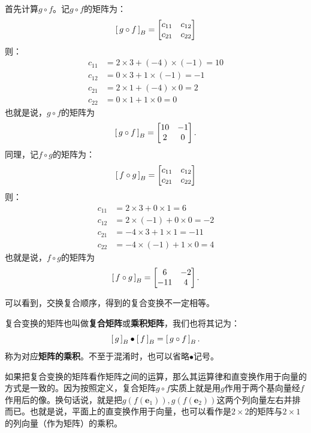 \documentclass[12pt,UTF8]{ctexbook}
\begin{document}
\begin{so}
    首先计算$g\circ f$。记$g\circ f$的矩阵为：    
    $$
        \bmat{g\circ f}[B] = 
        \begin{bmatrix}
            c_{11} & c_{12} \\ c_{21} & c_{22}
        \end{bmatrix}
    $$
    则：
    \begin{align*}
        c_{11} &= 2 \times 3 + (-4)\times (-1) = 10 \\
        c_{12} &= 0 \times 3 + 1 \times (-1) = -1  \\
        c_{21} &= 2 \times 1 + (-4)\times 0 = 2  \\
        c_{22} &= 0 \times 1 + 1 \times 0 = 0  
    \end{align*}
    也就是说，$g\circ f$的矩阵为
    $$
        \bmat{g\circ f}[B] = 
        \begin{bmatrix}
            10 & -1 \\ 2 & 0
        \end{bmatrix}.
    $$
    同理，记$f\circ g$的矩阵为：    
    $$
        \bmat{f\circ g}[B] = 
        \begin{bmatrix}
            c_{11} & c_{12} \\ c_{21} & c_{22}
        \end{bmatrix}
    $$
    则：
    \begin{align*}
        c_{11} &= 2 \times 3 + 0 \times 1 = 6 \\
        c_{12} &= 2 \times (-1) + 0 \times 0 = -2  \\
        c_{21} &= -4 \times 3 + 1 \times 1 = -11  \\
        c_{22} &= -4 \times (-1) + 1 \times 0 = 4  
    \end{align*}
    也就是说，$f\circ g$的矩阵为
    $$
        \bmat{f\circ g}[B] = 
        \begin{bmatrix}
            6 & -2 \\ -11 & 4
        \end{bmatrix}.
    $$
\end{so}

可以看到，交换复合顺序，得到的复合变换不一定相等。

复合变换的矩阵也叫做\textbf{复合矩阵}或\textbf{乘积矩阵}，我们也将其记为：
$$ \bmat{g}[B] \bullet \bmat{f}[B] = \bmat{g\circ f}[B].$$
称为对应\textbf{矩阵的乘积}。不至于混淆时，也可以省略$\bullet$记号。

如果把复合变换的矩阵看作矩阵之间的运算，那么其运算律和直变换作用于向量的方式是一致的。因为按照定义，复合矩阵$g\circ f$实质上就是用$g$作用于两个基向量经$f$作用后的像。换句话说，就是把$g(f(\mathbf{e}_1)),g(f(\mathbf{e}_2))$这两个列向量左右并排而已。也就是说，平面上的直变换作用于向量，也可以看作是$2\times 2$的矩阵与$2\times 1$的列向量（作为矩阵）的乘积。
\end{document}
